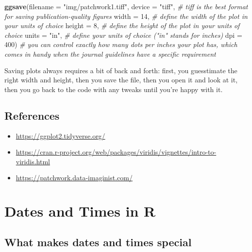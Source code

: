 \documentclass[
]{book}
\newenvironment{Shaded}{\begin{snugshade}}{\end{snugshade}}
\newcommand{\AttributeTok}[1]{\textcolor[rgb]{0.13,0.29,0.53}{#1}}
\newcommand{\CommentTok}[1]{\textcolor[rgb]{0.56,0.35,0.01}{\textit{#1}}}
\newcommand{\DecValTok}[1]{\textcolor[rgb]{0.00,0.00,0.81}{#1}}
\newcommand{\FunctionTok}[1]{\textcolor[rgb]{0.13,0.29,0.53}{\textbf{#1}}}
\newcommand{\NormalTok}[1]{#1}
\newcommand{\StringTok}[1]{\textcolor[rgb]{0.31,0.60,0.02}{#1}}
\providecommand{\tightlist}{%
  \setlength{\itemsep}{0pt}\setlength{\parskip}{0pt}}
\begin{document}
\begin{Shaded}
\begin{Highlighting}[]
\FunctionTok{ggsave}\NormalTok{(}\AttributeTok{filename =} \StringTok{"img/patchwork1.tiff"}\NormalTok{, }
       \AttributeTok{device =} \StringTok{"tiff"}\NormalTok{, }\CommentTok{\# tiff is the best format for saving publication{-}quality figures}
       \AttributeTok{width =} \DecValTok{14}\NormalTok{, }\CommentTok{\# define the width of the plot in your units of choice}
       \AttributeTok{height =} \DecValTok{8}\NormalTok{, }\CommentTok{\# define the height of the plot in your units of choice}
       \AttributeTok{units =} \StringTok{"in"}\NormalTok{, }\CommentTok{\# define your units of choice ("in" stands for inches)}
       \AttributeTok{dpi =} \DecValTok{400}\NormalTok{) }\CommentTok{\# you can control exactly how many dots per inches your plot has, which comes in handy when the journal guidelines have a specific requirement}
\end{Highlighting}
\end{Shaded}

Saving plots always requires a bit of back and forth: first, you guesstimate
the right width and height, then you save the file, then you open it and look at
it, then you go back to the code with any tweaks until you're happy with it.

\hypertarget{references-8}{%
\section{References}\label{references-8}}

\begin{itemize}
\tightlist
\item
  \url{https://ggplot2.tidyverse.org/}
\item
  \url{https://cran.r-project.org/web/packages/viridis/vignettes/intro-to-viridis.html}
\item
  \url{https://patchwork.data-imaginist.com/}
\end{itemize}

\hypertarget{lubridate}{%
\chapter{Dates and Times in R}\label{lubridate}}

\hypertarget{what-makes-dates-and-times-special}{%
\section{What makes dates and times special}\label{what-makes-dates-and-times-special}}
\end{document}
